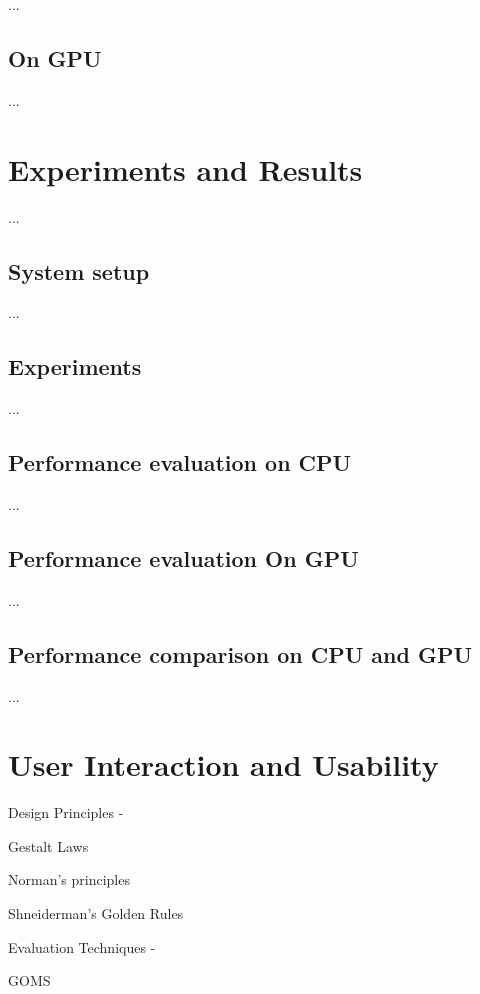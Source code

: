 \documentclass[english]{tktltiki}
\begin{document}
...


\subsection{On GPU}

...


\section{Experiments and Results}

...


\subsection{System setup}

...


\subsection{Experiments}

...


\subsection{Performance evaluation on CPU}

...

\subsection{Performance evaluation On GPU}

...

\subsection{Performance comparison on CPU and GPU}

...


\section{User Interaction and Usability}

Design Principles -

Gestalt Laws

Norman's principles

Shneiderman's Golden Rules

Evaluation Techniques -

GOMS
\end{document}
